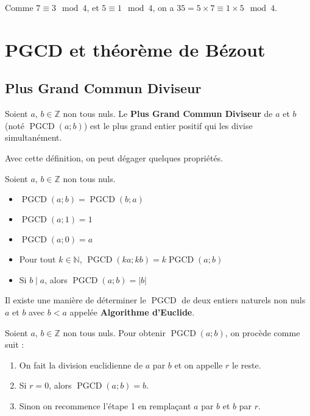 	\begin{tip}[Exemple]
		Comme $7 \equiv 3 \mod 4$, et $5 \equiv 1 \mod 4$, on a $35 = 5 \times 7 \equiv 1 \times 5 \mod 4$.
	\end{tip}

	\section{PGCD et théorème de Bézout}

	\subsection{Plus Grand Commun Diviseur}

	\begin{formula}[Définition]
		Soient $a$, $b \in \mathbb{Z}$ non tous nuls. Le \textbf{Plus Grand Commun Diviseur} de $a$ et $b$ (noté $\operatorname{PGCD}(a; b)$) est le plus grand entier positif qui les divise simultanément.
	\end{formula}

	Avec cette définition, on peut dégager quelques propriétés.

	\begin{formula}[Propriétés]
		Soient $a$, $b \in \mathbb{Z}$ non tous nuls.
		\begin{itemize}
			\item $\operatorname{PGCD}(a; b) = \operatorname{PGCD}(b; a)$
			\item $\operatorname{PGCD}(a; 1) = 1$
			\item $\operatorname{PGCD}(a; 0) = a$
			\item Pour tout $k \in \mathbb{N}$, $\operatorname{PGCD}(ka; kb) = k \operatorname{PGCD}(a; b)$
			\item Si $b \mid a$, alors $\operatorname{PGCD}(a; b) = |b|$
		\end{itemize}
	\end{formula}

	Il existe une manière de déterminer le $\operatorname{PGCD}$ de deux entiers naturels non nuls $a$ et $b$ avec $b < a$ appelée \textbf{Algorithme d'Euclide}.

	\begin{formula}
		Soient $a$, $b \in \mathbb{Z}$ non tous nuls. Pour obtenir $\operatorname{PGCD}(a; b)$, on procède comme suit :
		\begin{enumerate}
			\item On fait la division euclidienne de $a$ par $b$ et on appelle $r$ le reste.
			\item Si $r = 0$, alors $\operatorname{PGCD}(a; b) = b$.
			\item Sinon on recommence l'étape 1 en remplaçant $a$ par $b$ et $b$ par $r$.
		\end{enumerate}
	\end{formula}

